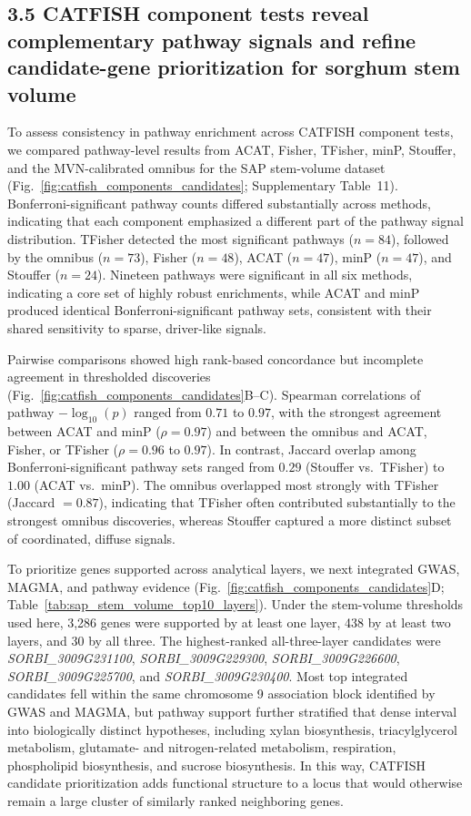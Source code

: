 \documentclass[unnumsec,webpdf,contemporary,large]{oup-authoring-template}%
\theoremstyle{thmstyleone}%
\theoremstyle{thmstyletwo}%
\theoremstyle{thmstylethree}%
\begin{document}
\subsection*{3.5 CATFISH component tests reveal complementary pathway signals and refine candidate-gene prioritization for sorghum stem volume}

To assess consistency in pathway enrichment across CATFISH component tests, we compared pathway-level results from ACAT, Fisher, TFisher, minP, Stouffer, and the MVN-calibrated omnibus for the SAP stem-volume dataset (Fig.~\ref{fig:catfish_components_candidates}; Supplementary Table~11). Bonferroni-significant pathway counts differed substantially across methods, indicating that each component emphasized a different part of the pathway signal distribution. TFisher detected the most significant pathways (\(n=84\)), followed by the omnibus (\(n=73\)), Fisher (\(n=48\)), ACAT (\(n=47\)), minP (\(n=47\)), and Stouffer (\(n=24\)). Nineteen pathways were significant in all six methods, indicating a core set of highly robust enrichments, while ACAT and minP produced identical Bonferroni-significant pathway sets, consistent with their shared sensitivity to sparse, driver-like signals.

Pairwise comparisons showed high rank-based concordance but incomplete agreement in thresholded discoveries (Fig.~\ref{fig:catfish_components_candidates}B--C). Spearman correlations of pathway \(-\log_{10}(p)\) ranged from \(0.71\) to \(0.97\), with the strongest agreement between ACAT and minP (\(\rho = 0.97\)) and between the omnibus and ACAT, Fisher, or TFisher (\(\rho = 0.96\) to \(0.97\)). In contrast, Jaccard overlap among Bonferroni-significant pathway sets ranged from \(0.29\) (Stouffer vs.\ TFisher) to \(1.00\) (ACAT vs.\ minP). The omnibus overlapped most strongly with TFisher (Jaccard \(= 0.87\)), indicating that TFisher often contributed substantially to the strongest omnibus discoveries, whereas Stouffer captured a more distinct subset of coordinated, diffuse signals.

To prioritize genes supported across analytical layers, we next integrated GWAS, MAGMA, and pathway evidence (Fig.~\ref{fig:catfish_components_candidates}D; Table~\ref{tab:sap_stem_volume_top10_layers}). Under the stem-volume thresholds used here, 3,286 genes were supported by at least one layer, 438 by at least two layers, and 30 by all three. The highest-ranked all-three-layer candidates were \textit{SORBI\_3009G231100}, \textit{SORBI\_3009G229300}, \textit{SORBI\_3009G226600}, \textit{SORBI\_3009G225700}, and \textit{SORBI\_3009G230400}. Most top integrated candidates fell within the same chromosome 9 association block identified by GWAS and MAGMA, but pathway support further stratified that dense interval into biologically distinct hypotheses, including xylan biosynthesis, triacylglycerol metabolism, glutamate- and nitrogen-related metabolism, respiration, phospholipid biosynthesis, and sucrose biosynthesis. In this way, CATFISH candidate prioritization adds functional structure to a locus that would otherwise remain a large cluster of similarly ranked neighboring genes.
\end{document}
